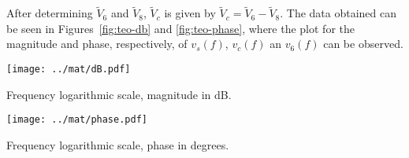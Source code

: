 After determining $\tilde{V}_6$ and $\tilde{V}_8$, $\tilde{V}_c$ is given by $\tilde{V}_c = \tilde{V}_6 - \tilde{V}_8$. The data obtained can be seen in Figures~\ref{fig:teo-db} and \ref{fig:teo-phase}, where the plot for the magnitude and phase, respectively, of $v_s(f)$, $v_c(f)$ an $v_6(f)$ can be observed.\\

\begin{minipage}[b]{0.48\textwidth}
\centering
    \texttt{[image: ../mat/dB.pdf]}
    \captionsetup{type=figure}
\caption{Frequency logarithmic scale, magnitude in dB.}
\label{fig:teo-db}
\end{minipage}
\begin{minipage}[b]{0.48\textwidth}
\centering
    \texttt{[image: ../mat/phase.pdf]}
    \captionsetup{type=figure}
  \caption{Frequency logarithmic scale, phase in degrees.}
  \label{fig:teo-phase}
\end{minipage}
